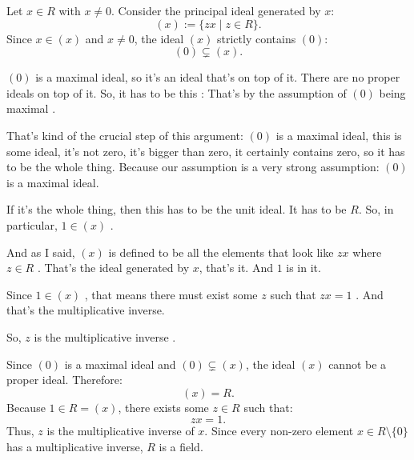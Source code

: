 \begin{content}
Let $x \in R$ with $x \neq 0$. Consider the principal ideal generated by $x$:
\begin{equation}\label{eq:principal-ideal-x}
(x) := \{ z x \mid z \in R \}.
\end{equation}
Since $x \in (x)$ and $x \neq 0$, the ideal $(x)$ strictly contains $(0)$:
\begin{equation}\label{eq:zero-strictly-in-x}
(0) \subsetneq (x).
\end{equation}
\end{content}

\begin{speech}[00:19:16 - 00:20:21]
$(0)$ is a maximal ideal, so it's an ideal that's on top of it. There are no proper ideals on top of it. So, it has to be this : That's by the assumption of $(0)$ being maximal .

That's kind of the crucial step of this argument: $(0)$ is a maximal ideal, this is some ideal, it's not zero, it's bigger than zero, it certainly contains zero, so it has to be the whole thing. Because our assumption is a very strong assumption: $(0)$ is a maximal ideal.

If it's the whole thing, then this has to be the unit ideal. It has to be $R$. So, in particular, $1 \in (x)$ .

And as I said, $(x)$ is defined to be all the elements that look like $z x$ where $z \in R$ . That's the ideal generated by $x$, that's it. And $1$ is in it.

Since $1 \in (x)$ , that means there must exist some $z$ such that $z x = 1$ . And that's the multiplicative inverse.

So, $z$ is the multiplicative inverse .
\end{speech}

\begin{content}
Since $(0)$ is a maximal ideal and $(0) \subsetneq (x)$, the ideal $(x)$ cannot be a proper ideal. Therefore:
\begin{equation}\label{eq:x-equals-r}
(x) = R.
\end{equation}
Because $1 \in R = (x)$, there exists some $z \in R$ such that:
\begin{equation}\label{eq:mult-inverse-z}
z x = 1.
\end{equation}
Thus, $z$ is the multiplicative inverse of $x$. Since every non-zero element $x \in R \setminus \{0\}$ has a multiplicative inverse, $R$ is a field.
\end{content}


